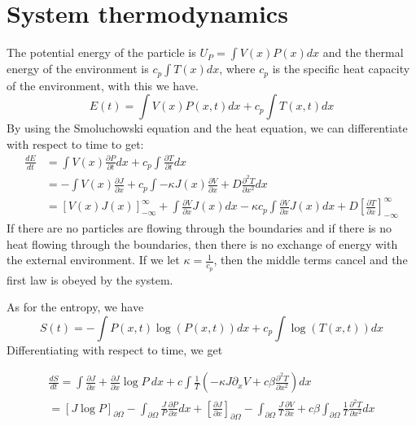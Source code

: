 \section{System thermodynamics}
The potential energy of the particle is $U_P = \int V(x) P(x) dx$ and the thermal energy of the environment is $c_p \int T(x) dx$, where $c_p$ is the specific heat capacity of the environment, with this we have.
\begin{equation}
E(t) = \int V(x)P(x, t) dx + c_p \int T(x, t) dx
\end{equation}
By using the Smoluchowski equation and the heat equation, we can differentiate with respect to time to get:
\begin{align}
\frac{d E}{d t} & = \int V(x) \frac{\partial P}{\partial t} dx + c_p \int \frac{\partial T}{\partial t} dx \\
 & = -\int V(x) \frac{\partial J}{\partial x} + c_p \int -\kappa J(x) \frac{\partial V}{\partial x} + D \frac{\partial^2 T}{\partial x^2} dx \\
 & = [V(x)J(x)]_{-\infty}^\infty + \int \frac{\partial V}{\partial x} J(x) dx - \kappa c_p \int \frac{\partial V}{\partial x} J(x) dx + D \left [\frac{\partial T}{\partial x} \right]_{-\infty}^{\infty}
\end{align}
If there are no particles are flowing through the boundaries and if there is no heat flowing through the boundaries, then there is no exchange of energy with the external environment. If we let $\kappa = \frac{1}{c_p}$, then the middle terms cancel and the first law is obeyed by the system.

As for the entropy, we have \cite{Streater1997a}
\begin{equation}
S(t) = -\int P(x, t) \log(P(x, t)) dx + c_p \int \log(T(x, t))dx
\end{equation}
Differentiating with respect to time, we get

\begin{align}
\frac{d S}{d t} =  \int \frac{\partial J}{\partial x} + \frac{\partial J}{\partial x} \log P \ dx + c \int \frac{1}{T} \left(-\kappa J \partial_x V + c \beta \frac{\partial^2 T}{\partial x^2} \right) dx \\
                     =  [J \log P]_{\partial \Omega} - \int_{\partial \Omega} \frac{J}{P} \frac{\partial P}{\partial x} dx + [\frac{\partial J}{\partial x}]_{\partial \Omega} - \int_{\partial \Omega} \frac{J}{T} \frac{\partial V}{\partial x} + c \beta \int_{\partial \Omega} \frac{1}{T} \frac{\partial^2 T}{\partial x^2} dx
\end{align}

